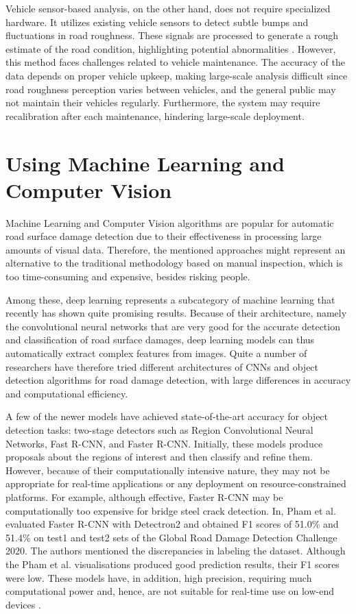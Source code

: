 Vehicle sensor-based analysis, on the other hand, does not require specialized hardware. It utilizes existing vehicle sensors to detect subtle bumps and fluctuations in road roughness. These signals are processed to generate a rough estimate of the road condition, highlighting potential abnormalities \cite{bmwpaper}. However, this method faces challenges related to vehicle maintenance. The accuracy of the data depends on proper vehicle upkeep, making large-scale analysis difficult since road roughness perception varies between vehicles, and the general public may not maintain their vehicles regularly. Furthermore, the system may require recalibration after each maintenance, hindering large-scale deployment.

\section{Using Machine Learning and Computer Vision}



Machine Learning and Computer Vision algorithms are popular for automatic road surface damage detection due to their effectiveness in processing large amounts of visual data. Therefore, the mentioned approaches might represent an alternative to the traditional methodology based on manual inspection, which is too time-consuming and expensive, besides risking people.

Among these, deep learning represents a subcategory of machine learning that recently has shown quite promising results. Because of their architecture, namely the convolutional neural networks that are very good for the accurate detection and classification of road surface damages, deep learning models can thus automatically extract complex features from images. Quite a number of researchers have therefore tried different architectures of CNNs and object detection algorithms for road damage detection, with large differences in accuracy and computational efficiency.

A few of the newer models have achieved state-of-the-art accuracy for object detection tasks: two-stage detectors such as Region Convolutional Neural Networks, Fast R-CNN, and Faster R-CNN. Initially, these models produce proposals about the regions of interest and then classify and refine them. However, because of their computationally intensive nature, they may not be appropriate for real-time applications or any deployment on resource-constrained platforms. For example, although effective, Faster R-CNN may be computationally too expensive for bridge steel crack detection. In, Pham et al. \cite{130} evaluated Faster R-CNN with Detectron2 and obtained F1 scores of 51.0\% and 51.4\% on test1 and test2 sets of the Global Road Damage Detection Challenge 2020. The authors mentioned the discrepancies in labeling the dataset. Although the Pham et al. visualisations produced good prediction results, their F1 scores were low. These models have, in addition, high precision, requiring much computational power and, hence, are not suitable for real-time use on low-end devices \cite{130}.

